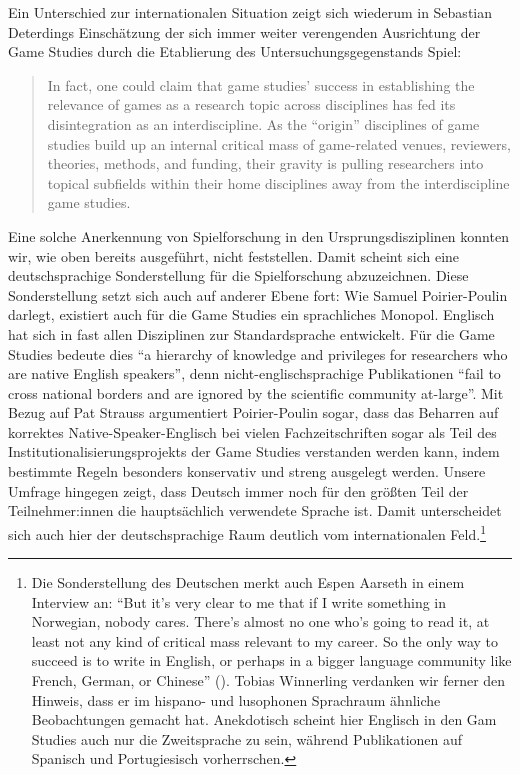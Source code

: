 \documentclass{scrartcl}
\begin{document}
Ein Unterschied zur internationalen Situation zeigt sich wiederum in Sebastian Deterdings Einschätzung der sich immer weiter verengenden Ausrichtung der Game Studies durch die Etablierung des Untersuchungsgegenstands Spiel:

\begin{quote}
   In fact, one could claim that game studies' success in establishing the relevance of games as a research topic across disciplines has fed its disintegration as an interdiscipline.
   As the \enquote{origin} disciplines of game studies build up an internal critical mass of game-related venues, reviewers, theories, methods, and funding, their gravity is pulling researchers into topical subfields within their home disciplines away from the interdiscipline game studies.\autocite[][S.~530]{deterding_pyrrhic_2017}
\end{quote}

Eine solche Anerkennung von Spielforschung in den Ursprungsdisziplinen konnten wir, wie oben bereits ausgeführt, nicht feststellen.
Damit scheint sich eine deutschsprachige Sonderstellung für die Spielforschung abzuzeichnen.
Diese Sonderstellung setzt sich auch auf anderer Ebene fort:
Wie Samuel Poirier-Poulin darlegt, existiert auch für die Game Studies ein sprachliches Monopol.
Englisch hat sich in fast allen Disziplinen zur Standardsprache entwickelt.
Für die Game Studies bedeute dies \enquote{a hierarchy of knowledge and privileges for researchers who are native English speakers}, denn nicht-englischsprachige Publikationen \enquote{fail to cross national borders and are ignored by the scientific community at-large}.\autocite[][S.~676]{poirier-poulin_enquotepublish_2025}
Mit Bezug auf Pat Strauss argumentiert Poirier-Poulin sogar, dass das Beharren auf korrektes Native-Speaker-Englisch bei vielen Fachzeitschriften sogar als Teil des Institutionalisierungsprojekts der Game Studies verstanden werden kann, indem bestimmte Regeln besonders konservativ und streng ausgelegt werden.\autocite[][S.~682]{poirier-poulin_enquotepublish_2025}
Unsere Umfrage hingegen zeigt, dass Deutsch immer noch für den größten Teil der Teilnehmer:innen die hauptsächlich verwendete Sprache ist.
Damit unterscheidet sich auch hier der deutschsprachige Raum deutlich vom internationalen Feld.\footnote{Die Sonderstellung des Deutschen merkt auch Espen Aarseth in einem Interview an: \enquote{But it's very clear to me that if I write something in Norwegian, nobody cares. There's almost no one who's going to read it, at least not any kind of critical mass relevant to my career. So the only way to succeed is to write in English, or perhaps in a bigger language community like French, German, or Chinese} (\autocite[][S.~139]{mejeur_definitions_2025}). Tobias Winnerling verdanken wir ferner den Hinweis, dass er im hispano- und lusophonen Sprachraum ähnliche Beobachtungen gemacht hat. Anekdotisch scheint hier Englisch in den Gam Studies auch nur die Zweitsprache zu sein, während Publikationen auf Spanisch und Portugiesisch vorherrschen.}
\end{document}
